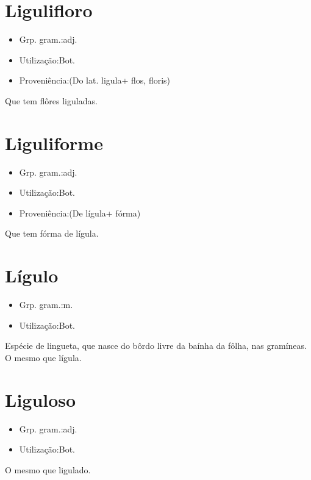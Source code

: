 \section{Ligulifloro}
\begin{itemize}
\item {Grp. gram.:adj.}
\end{itemize}
\begin{itemize}
\item {Utilização:Bot.}
\end{itemize}
\begin{itemize}
\item {Proveniência:(Do lat. \textunderscore ligula\textunderscore  + \textunderscore flos\textunderscore , \textunderscore floris\textunderscore )}
\end{itemize}
Que tem flôres liguladas.
\section{Liguliforme}
\begin{itemize}
\item {Grp. gram.:adj.}
\end{itemize}
\begin{itemize}
\item {Utilização:Bot.}
\end{itemize}
\begin{itemize}
\item {Proveniência:(De \textunderscore lígula\textunderscore  + \textunderscore fórma\textunderscore )}
\end{itemize}
Que tem fórma de lígula.
\section{Lígulo}
\begin{itemize}
\item {Grp. gram.:m.}
\end{itemize}
\begin{itemize}
\item {Utilização:Bot.}
\end{itemize}
Espécie de lingueta, que nasce do bôrdo livre da baínha da fôlha, nas gramíneas.
O mesmo que \textunderscore lígula\textunderscore .
\section{Liguloso}
\begin{itemize}
\item {Grp. gram.:adj.}
\end{itemize}
\begin{itemize}
\item {Utilização:Bot.}
\end{itemize}
O mesmo que \textunderscore ligulado\textunderscore .
